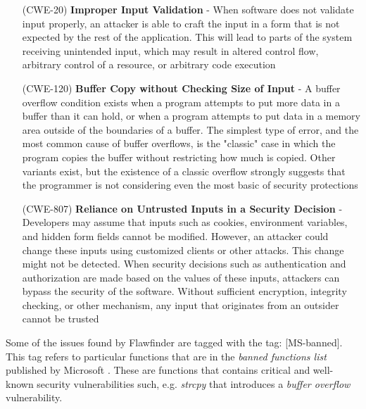 \begin{itemize}
	\item[(CWE-20) ] \textbf{Improper Input Validation} - When software does not validate input properly, an attacker is able to craft the input in a form that is not expected by the rest of the application. This will lead to parts of the system receiving unintended input, which may result in altered control flow, arbitrary control of a resource, or arbitrary code execution \cite{bibitem7}
	\item[(CWE-120) ] \textbf{Buffer Copy without Checking Size of Input} - A buffer overflow condition exists when a program attempts to put more data in a buffer than it can hold, or when a program attempts to put data in a memory area outside of the boundaries of a buffer. The simplest type of error, and the most common cause of buffer overflows, is the "classic" case in which the program copies the buffer without restricting how much is copied. Other variants exist, but the existence of a classic overflow strongly suggests that the programmer is not considering even the most basic of security protections \cite{bibitem8}
	\item[(CWE-807) ] \textbf{Reliance on Untrusted Inputs in a Security Decision} - Developers may assume that inputs such as cookies, environment variables, and hidden form fields cannot be modified. However, an attacker could change these inputs using customized clients or other attacks. This change might not be detected. When security decisions such as authentication and authorization are made based on the values of these inputs, attackers can bypass the security of the software.\newline
Without sufficient encryption, integrity checking, or other mechanism, any input that originates from an outsider cannot be trusted \cite{bibitem9}
\end{itemize}

Some of the issues found by Flawfinder are tagged with the tag: [MS-banned]. This tag refers to particular functions that are in the \textsl{banned functions list} published by Microsoft \cite{bibitem10}. These are functions that contains critical and well-known security vulnerabilities such, e.g. \textsl{strcpy} that introduces a \textsl{buffer overflow} vulnerability.\newline\newline

